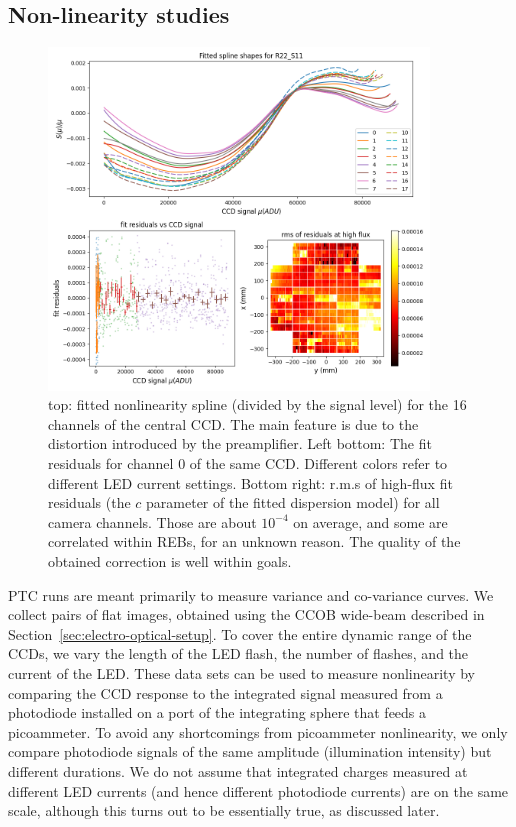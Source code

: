 \subsection{Non-linearity studies}\label{nonlinearity}
\begin{figure}[ht]
\begin{centering}
\includegraphics[width=0.9\textwidth]{figures/nonlin_plots.png}
\end{centering}
\caption{top: fitted nonlinearity spline (divided by the signal level) for the 16 channels of the central CCD. The main feature is due to the distortion introduced by the preamplifier. Left bottom: The fit residuals for channel 0 of the same CCD. Different colors refer to different LED current settings. Bottom right: r.m.s of high-flux fit residuals (the $c$ parameter of the fitted dispersion model) for all camera channels. Those are about $10^{-4}$ on average, and some are correlated within REBs, for an unknown reason. The quality of the obtained correction is well within goals.\label{fig:nonlin_model}}

\end{figure}

PTC runs are meant primarily to measure variance and co-variance curves. We collect pairs of flat images, obtained using the CCOB wide-beam described in Section~\ref{sec:electro-optical-setup}. To cover the entire dynamic range of the CCDs, we vary the length of the LED flash, the number of flashes, and the current of the LED. These data sets can be used to measure nonlinearity by comparing the CCD response to the integrated signal measured from a photodiode installed on a port of the integrating sphere that feeds a picoammeter. To avoid any shortcomings from picoammeter nonlinearity, we only compare photodiode signals of the same amplitude (illumination intensity) but different durations. We do not assume that integrated charges measured at different LED currents (and hence different photodiode currents) are on the same scale, although this turns out to be essentially true, as discussed later. 

